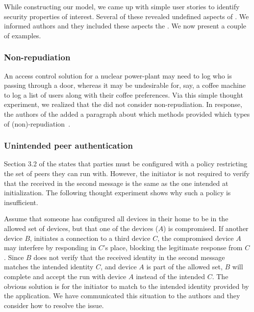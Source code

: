 \documentclass[runningheads, envcountsame, a4paper, draft, x11names]{llncs}
\newcommand{\spacehack}{\vspace{-1em}}
\begin{document}
While constructing our model, we came up with simple user stories to identify
security properties of interest.
%
Several of these revealed undefined aspects of \mEdhoc{}.
%
We informed \mEdhoc{} authors and they included these aspects the \mSpec{}.
%
We now present a couple of examples.
%

\spacehack
\subsubsection{Non-repudiation}
An access control solution for a nuclear power-plant may need to log who is
passing through a door, whereas it may be undesirable for, say, a coffee
machine to log a list of users along with their coffee preferences.
%
Via this simple thought experiment, we realized that the \mSpec{} did not
consider non-repudiation.
%
In response, the authors of the \mSpec{} added a paragraph about which methods
provided which types of (non)-repudiation~\cite{personalCommunication}.

\spacehack
\subsubsection{Unintended peer authentication}
Section 3.2 of the \mSpec{} states that parties must be configured
with a policy restricting the set of peers they can run \mEdhoc{} with.
%
However, the initiator is not required to verify that the \mIdcredr{} received
in the second message is the same as the one intended at initialization.
%
The following thought experiment shows why such a policy is insufficient.
%

Assume that someone has configured all devices in their home to be in the
allowed set of devices, but that one of the devices ($A$) is compromised.
%
If another device $B$, initiates a connection to a third device $C$, the
compromised device $A$ may interfere by responding in $C$'s place, blocking
the legitimate response from $C$.
%
Since $B$ does not verify that the received identity in the second message
matches the intended identity $C$, and device $A$ is part of the allowed set,
$B$ will complete and accept the \mEdhoc{} run with device $A$ instead of the
intended $C$.
%
The obvious solution is for the initiator to match \mIdcredr{} to the intended
identity provided by the application.
%
We have communicated this situation to the \mEdhoc{} authors and they consider
how to resolve the issue.
%
\end{document}
